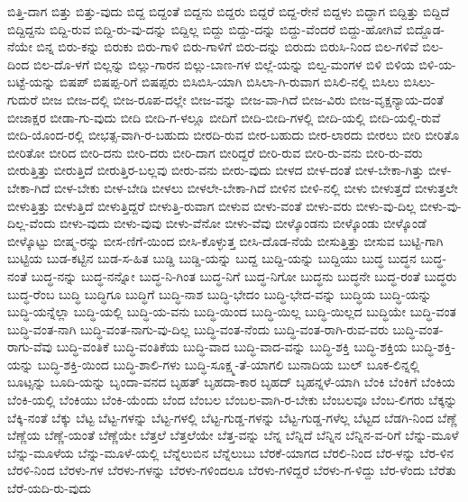 {ಬಿತ್ತಿ-ದಾಗ
ಬಿತ್ತು
ಬಿತ್ತು-ವುದು
ಬಿದ್ದ
ಬಿದ್ದಂತೆ
ಬಿದ್ದನು
ಬಿದ್ದರು
ಬಿದ್ದರೆ
ಬಿದ್ದ-ರೇನೆ
ಬಿದ್ದಳು
ಬಿದ್ದಾಗ
ಬಿದ್ದಿತ್ತು
ಬಿದ್ದಿದೆ
ಬಿದ್ದಿದ್ದನು
ಬಿದ್ದಿ-ರುವ
ಬಿದ್ದಿ-ರು-ವು-ದನ್ನು
ಬಿದ್ದಿಲ್ಲ
ಬಿದ್ದು
ಬಿದ್ದು-ದನ್ನು
ಬಿದ್ದು-ವೆಂದರೆ
ಬಿದ್ದು-ಹೋಗಿವೆ
ಬಿದ್ದೊಡ-ನೆಯೇ
ಬಿನ್ನ
ಬಿರು-ಕನ್ನು
ಬಿರುಕು
ಬಿರು-ಗಾಳಿ
ಬಿರು-ಗಾಳಿಗೆ
ಬಿರು-ದನ್ನು
ಬಿರುದು
ಬಿರುಸಿ-ನಿಂದ
ಬಿಲ-ಗಳಿವೆ
ಬಿಲ-ದಿಂದ
ಬಿಲ-ದೊ-ಳಗೆ
ಬಿಲ್ಲನ್ನು
ಬಿಲ್ಲು-ಗಾರನ
ಬಿಲ್ಲು-ಬಾಣ-ಗಳ
ಬಿಲ್ಲೆ-ಯನ್ನು
ಬಿಲ್ವ-ಮಂಗಳ
ಬಿಳಿ
ಬಿಳಿಯ
ಬಿಳಿ-ಯ-ಬಟ್ಟೆ-ಯನ್ನು
ಬಿಷಪ್
ಬಿಷಪ್ಪ-ರಿಗೆ
ಬಿಷಪ್ಪರು
ಬಿಸಿಬಿಸಿ-ಯಾಗಿ
ಬಿಸಿಲಾ-ಗಿ-ರುವಾಗ
ಬಿಸಿಲಿ-ನಲ್ಲಿ
ಬಿಸಿಲು
ಬಿಸಿಲು-ಗುದುರೆ
ಬೀಜ
ಬೀಜ-ದಲ್ಲಿ
ಬೀಜ-ರೂಪ-ದಲ್ಲೇ
ಬೀಜ-ವನ್ನು
ಬೀಜ-ವಾ-ಗಿದೆ
ಬೀಜ-ವಿರು
ಬೀಜ-ವೃಕ್ಷನ್ಯಾಯ-ದಂತೆ
ಬೀಜಾಕ್ಷರ
ಬೀಡಾ-ಗು-ವುದು
ಬೀದಿ
ಬೀದಿ-ಗ-ಳಲ್ಲೂ
ಬೀದಿಗೆ
ಬೀದಿ-ಬೀದಿ-ಗಳಲ್ಲಿ
ಬೀದಿ-ಯಲ್ಲಿ
ಬೀದಿ-ಯಲ್ಲಿ-ರುವೆ
ಬೀದಿ-ಯೊಂದ-ರಲ್ಲಿ
ಬೀಭತ್ಸ-ವಾಗಿ-ರ-ಬಹುದು
ಬೀರದಿ-ರುವ
ಬೀರ-ಬಹುದು
ಬೀರ-ಲಾರದು
ಬೀರಲು
ಬೀರಿ
ಬೀರಿತೊ
ಬೀರಿತೋ
ಬೀರಿದ
ಬೀರಿ-ದನು
ಬೀರಿ-ದರು
ಬೀರಿ-ದಾಗ
ಬೀರಿದ್ದರೆ
ಬೀರಿ-ರುವ
ಬೀರಿ-ರು-ವನು
ಬೀರಿ-ರು-ವರು
ಬೀರುತ್ತಿತ್ತು
ಬೀರುತ್ತಿದೆ
ಬೀರುತ್ತಿರ-ಬಲ್ಲವು
ಬೀರು-ವನು
ಬೀರು-ವುದು
ಬೀಳದ
ಬೀಳ-ದಂತೆ
ಬೀಳ-ಬೇಕಾ-ಗಿತ್ತು
ಬೀಳ-ಬೇಕಾ-ಗಿದೆ
ಬೀಳ-ಬೇಕು
ಬೀಳ-ಬೇಡಿ
ಬೀಳಲು
ಬೀಳಲೇ-ಬೇಕಾ-ಗಿದೆ
ಬೀಳಿನ
ಬೀಳಿ-ನಲ್ಲಿ
ಬೀಳು
ಬೀಳುತ್ತದೆ
ಬೀಳುತ್ತಲೇ
ಬೀಳುತ್ತಿತ್ತು
ಬೀಳುತ್ತಿದೆ
ಬೀಳುತ್ತಿದ್ದರೆ
ಬೀಳುತ್ತಿ-ರುವಾಗ
ಬೀಳುವ
ಬೀಳು-ವಂತೆ
ಬೀಳು-ವರು
ಬೀಳು-ವು-ದಿಲ್ಲ
ಬೀಳು-ವು-ದಿಲ್ಲ-ವೆಂದು
ಬೀಳು-ವುದು
ಬೀಳು-ವುವು
ಬೀಳು-ವೆನೋ
ಬೀಳು-ವೆವು
ಬೀಳ್ಕೊಂಡನು
ಬೀಳ್ಕೊಂಡು
ಬೀಳ್ಕೊಂಡೆ
ಬೀಳ್ಕೊಟ್ಟು
ಬೀಷ್ಮ-ರನ್ನು
ಬೀಸ-ಣಿಗೆ-ಯಿಂದ
ಬೀಸಿ-ಕೊಳ್ಳುತ್ತ
ಬೀಸಿ-ದೊಡ-ನೆಯೆ
ಬೀಸುತ್ತಿತ್ತು
ಬೀಸುವ
ಬುಟ್ಟಿ-ಗಾಗಿ
ಬುಟ್ಟಿಯ
ಬುಡ-ಕಟ್ಟಿನ
ಬುಡ-ಸ-ಹಿತ
ಬುಡ್ಡಿ
ಬುಡ್ಡಿ-ಯನ್ನು
ಬುದ್ದ
ಬುದ್ದಿ-ಯನ್ನು
ಬುದ್ದಿಯು
ಬುದ್ಧ
ಬುದ್ಧನ
ಬುದ್ಧ-ನಂತೆ
ಬುದ್ಧ-ನನ್ನು
ಬುದ್ಧ-ನನ್ನೋ
ಬುದ್ಧ-ನಿ-ಗಿಂತ
ಬುದ್ಧ-ನಿಗೆ
ಬುದ್ಧ-ನಿಗೋ
ಬುದ್ಧನು
ಬುದ್ಧನೇ
ಬುದ್ಧ-ರಂತೆ
ಬುದ್ಧರು
ಬುದ್ಧ-ರೆಂಬ
ಬುದ್ಧಿ
ಬುದ್ಧಿಗೂ
ಬುದ್ಧಿಗೆ
ಬುದ್ಧಿ-ನಾಶ
ಬುದ್ಧಿ-ಭೇದಂ
ಬುದ್ಧಿ-ಭೇದ-ವನ್ನು
ಬುದ್ಧಿಯ
ಬುದ್ಧಿ-ಯನ್ನು
ಬುದ್ಧಿ-ಯನ್ನೆಲ್ಲಾ
ಬುದ್ಧಿ-ಯಲ್ಲಿ
ಬುದ್ಧಿ-ಯ-ವನು
ಬುದ್ಧಿ-ಯಿಂದ
ಬುದ್ಧಿ-ಯಿಲ್ಲ
ಬುದ್ಧಿ-ಯಿಲ್ಲದ
ಬುದ್ಧಿಯೇ
ಬುದ್ಧಿ-ವಂತ
ಬುದ್ಧಿ-ವಂತ-ನಾಗಿ
ಬುದ್ಧಿ-ವಂತ-ನಾಗು-ವು-ದಿಲ್ಲ
ಬುದ್ಧಿ-ವಂತ-ನೆಂದು
ಬುದ್ಧಿ-ವಂತ-ರಾಗಿ-ರುವ-ವರು
ಬುದ್ಧಿ-ವಂತ-ರಾಗು-ವೆವು
ಬುದ್ಧಿ-ವಂತಿಕೆ
ಬುದ್ಧಿ-ವಂತಿಕೆಯ
ಬುದ್ಧಿ-ವಾದ
ಬುದ್ಧಿ-ವಾದ-ವನ್ನು
ಬುದ್ಧಿ-ಶಕ್ತಿ
ಬುದ್ಧಿ-ಶಕ್ತಿಯ
ಬುದ್ಧಿ-ಶಕ್ತಿ-ಯನ್ನು
ಬುದ್ಧಿ-ಶಕ್ತಿ-ಯಿಂದ
ಬುದ್ಧಿ-ಶಾಲಿ-ಗಳು
ಬುದ್ಧಿ-ಸೂಕ್ಷ್ಮ-ತೆ-ಯಾಗಲಿ
ಬುನಾದಿಯ
ಬುಲ್
ಬೂಕ-ಲಿನ್ನಲ್ಲಿ
ಬೂಟ್ಸನ್ನು
ಬೂದಿ-ಯನ್ನು
ಬೃಂದಾ-ವನದ
ಬೃಹತ್
ಬೃಹದಾ-ಕಾರ
ಬೃಹದ್
ಬೃಹನ್ನಳೆ-ಯಾಗಿ
ಬೆಂಕಿ
ಬೆಂಕಿಗೆ
ಬೆಂಕಿಯ
ಬೆಂಕಿ-ಯಲ್ಲಿ
ಬೆಂಕಿಯು
ಬೆಂಕಿ-ಯೆಂದು
ಬೆಂದ
ಬೆಂಬಲ
ಬೆಂಬಲ-ವಾಗಿ-ರ-ಬೇಕು
ಬೆಂಬಲವೂ
ಬೆಂಬ-ಲಿಗರು
ಬೆಕ್ಕನ್ನು
ಬೆಕ್ಕಿ-ನಂತೆ
ಬೆಕ್ಕು
ಬೆಟ್ಟ
ಬೆಟ್ಟ-ಗಳನ್ನು
ಬೆಟ್ಟ-ಗಳಲ್ಲಿ
ಬೆಟ್ಟ-ಗುಡ್ಡ-ಗಳನ್ನು
ಬೆಟ್ಟ-ಗುಡ್ಡ-ಗಳೆಲ್ಲ
ಬೆಟ್ಟದ
ಬೆಡಗಿ-ನಿಂದ
ಬೆಣ್ಣೆ
ಬೆಣ್ಣೆಯ
ಬೆಣ್ಣೆ-ಯಂತೆ
ಬೆಣ್ಣೆಯೇ
ಬೆತ್ತಲೆ
ಬೆತ್ತಲೆಯೇ
ಬೆತ್ತ-ವನ್ನು
ಬೆನ್ನ
ಬೆನ್ನಿದೆ
ಬೆನ್ನಿನ
ಬೆನ್ನಿನ-ವ-ರಿಗೆ
ಬೆನ್ನು-ಮೂಳೆ
ಬೆನ್ನು-ಮೂಳೆಯ
ಬೆನ್ನು-ಮೂಳೆ-ಯಲ್ಲಿ
ಬೆನ್ನೆಲುಬಿನ
ಬೆನ್ನೆಲುಬು
ಬೆರಕೆ-ಯಾಗದ
ಬೆರಲಿ-ನಿಂದ
ಬೆರ-ಳನ್ನು
ಬೆರ-ಳಿನ
ಬೆರಳಿ-ನಿಂದ
ಬೆರಳು-ಗಳ
ಬೆರಳು-ಗಳನ್ನು
ಬೆರಳು-ಗಳಿಂದಲೂ
ಬೆರಳು-ಗಳಿದ್ದರೆ
ಬೆರಳು-ಗ-ಳಿದ್ದು
ಬೆರ-ಳೆಂದು
ಬೆರೆತು
ಬೆರೆ-ಯದಿ-ರು-ವುದು
}
